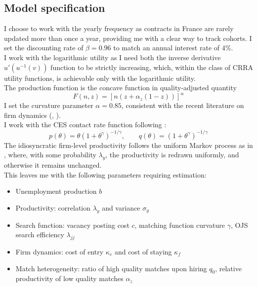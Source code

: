 \subsection{Model specification}
I choose to work with the yearly frequency as contracts in France are rarely updated more than once a year, providing me with a clear way to track cohorts. I set the discounting rate of $\beta = 0.96$ to match an annual interest rate of $4\%$. \\ 
I work with the logarithmic utility as I need both the inverse derivative $u'(u^{-1}(v))$ function to be strictly increasing, which, within the class of CRRA utility functions, is achievable only with the logarithmic utility. \\
The production function is the concave function in quality-adjusted quantity 
\[F(n,z) = [n(z + \alpha_z(1-z))]^\alpha\]
I set the curvature parameter $\alpha=0.85$, consistent with the recent literature on firm dynamics (\textcite{schaal2017}, \textcite{bilal2022}). \\
I work with the CES contact rate function following \textcite{menzio2011}:
\[ p(\theta) = \theta ( 1 + \theta^\gamma)^{-1/\gamma}, \:\:\:\:\:\:\:\:\: q(\theta) = (1+\theta^\gamma)^{-1/\gamma} \]
The idiosyncratic firm-level productivity follows the uniform Markov process as in \textcite{balke2022}, where, with some probability $\lambda_y$, the productivity is redrawn uniformly, and otherwise it remains unchanged. \\
This leaves me with the following parameters requiring estimation: 
\begin{itemize}
    \item Unemployment production $b$
    \item Productivity: correlation $\lambda_y$ and variance $\sigma_y$
    \item Search function: vacancy posting cost $c$, matching function curvature $\gamma$, OJS  search efficiency $\lambda_{jj}$
    \item Firm dynamics: cost of entry $\kappa_e$ and cost of staying $\kappa_f$
    \item Match heterogeneity: ratio of high quality matches upon hiring $q_0$, relative productivity of low quality matches $\alpha_z$
\end{itemize}
